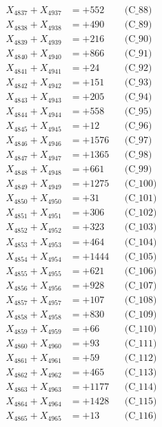 \documentclass[a4paper,10pt]{article}
\begin{document}
{\begin{align}
X_{4837} + X_{4937} &= +552 && \text{(C\_88)} \\
X_{4838} + X_{4938} &= +490 && \text{(C\_89)} \\
X_{4839} + X_{4939} &= +216 && \text{(C\_90)} \\
\allowbreak
X_{4840} + X_{4940} &= +866 && \text{(C\_91)} \\
X_{4841} + X_{4941} &= +24 && \text{(C\_92)} \\
X_{4842} + X_{4942} &= +151 && \text{(C\_93)} \\
X_{4843} + X_{4943} &= +205 && \text{(C\_94)} \\
X_{4844} + X_{4944} &= +558 && \text{(C\_95)} \\
\allowbreak
X_{4845} + X_{4945} &= +12 && \text{(C\_96)} \\
X_{4846} + X_{4946} &= +1576 && \text{(C\_97)} \\
X_{4847} + X_{4947} &= +1365 && \text{(C\_98)} \\
X_{4848} + X_{4948} &= +661 && \text{(C\_99)} \\
X_{4849} + X_{4949} &= +1275 && \text{(C\_100)} \\
\allowbreak
X_{4850} + X_{4950} &= +31 && \text{(C\_101)} \\
X_{4851} + X_{4951} &= +306 && \text{(C\_102)} \\
X_{4852} + X_{4952} &= +323 && \text{(C\_103)} \\
X_{4853} + X_{4953} &= +464 && \text{(C\_104)} \\
X_{4854} + X_{4954} &= +1444 && \text{(C\_105)} \\
\allowbreak
X_{4855} + X_{4955} &= +621 && \text{(C\_106)} \\
X_{4856} + X_{4956} &= +928 && \text{(C\_107)} \\
X_{4857} + X_{4957} &= +107 && \text{(C\_108)} \\
X_{4858} + X_{4958} &= +830 && \text{(C\_109)} \\
X_{4859} + X_{4959} &= +66 && \text{(C\_110)} \\
\allowbreak
X_{4860} + X_{4960} &= +93 && \text{(C\_111)} \\
X_{4861} + X_{4961} &= +59 && \text{(C\_112)} \\
X_{4862} + X_{4962} &= +465 && \text{(C\_113)} \\
X_{4863} + X_{4963} &= +1177 && \text{(C\_114)} \\
X_{4864} + X_{4964} &= +1428 && \text{(C\_115)} \\
\allowbreak
X_{4865} + X_{4965} &= +13 && \text{(C\_116)} \\

\end{align}}
\end{document}
